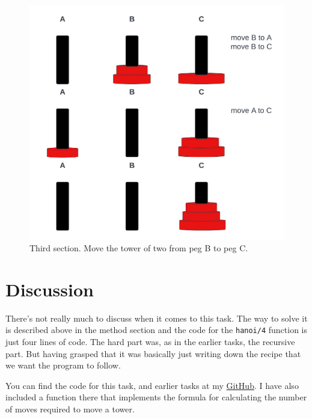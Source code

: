 \documentclass[a4paper,11pt]{article}
\begin{document}
\begin{figure}[ht]
    \includegraphics[width=\textwidth]{hanoi-third-segment.png}
    \caption{Third section. Move the tower of two from peg B to peg C.}
    \label{fig:third}
\end{figure}


\FloatBarrier
\section*{Discussion}
There's not really much to discuss when it comes to this task. The way to solve it is described above in the method section
and the code for the {\tt hanoi/4} function is just four lines of code. The hard part was, as in the earlier tasks, the 
recursive part. But having grasped that it was basically just writing down the recipe that we want the program to follow.

You can find the code for this task, and earlier tasks at my
\href{https://github.com/adrian-jonsson-sjoedin/ID1019-Programming-II/tree/main/Task1_Solution}{GitHub}. I have also included 
a function there that implements the formula for calculating the number of moves required to move a tower.
\end{document}
